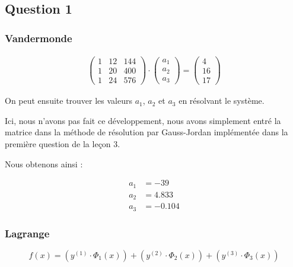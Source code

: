 \subsection{Question 1}

\subsubsection{Vandermonde}

\begin{equation}
	\begin{aligned}
		\begin{pmatrix}
			1 & 12 & 144\\
			1 & 20 & 400\\
			1 & 24 & 576
		\end{pmatrix}
		\cdot
		\begin{pmatrix}
			a_1\\
			a_2\\
			a_3
		\end{pmatrix}=
		\begin{pmatrix}
			4\\
			16\\
			17
		\end{pmatrix}
	\end{aligned}
\end{equation}

On peut ensuite trouver les valeurs $a_1$, $a_2$ et $a_3$ en résolvant le système.

Ici, nous n'avons pas fait ce développement, nous avons simplement entré la matrice dans la méthode de résolution par Gauss-Jordan implémentée dans la première question de la leçon 3.

Nous obtenons ainsi :

\begin{equation}
	\begin{aligned}
		a_1 &= -39\\
		a_2 &= 4.833\\
		a_3 &= -0.104
	\end{aligned}
\end{equation}

\subsubsection{Lagrange}

\begin{equation}
	f(x) = (y^{(1)} \cdot \Phi_1(x)) + (y^{(2)} \cdot \Phi_2(x)) + (y^{(3)} \cdot \Phi_3(x))
\end{equation}

